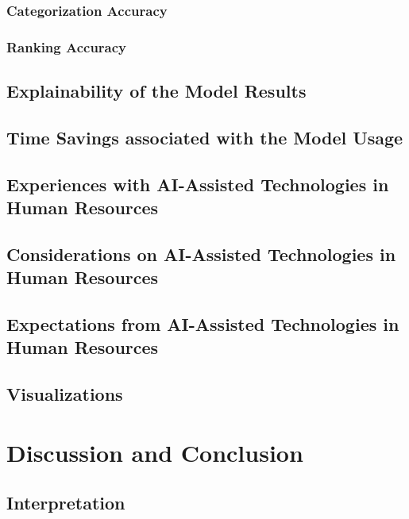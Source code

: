 \documentclass[draft,final]{thesisclass} %
\begin{document}
\subsection{Categorization Accuracy}
\lipsum[1]

\subsection{Ranking Accuracy}
\lipsum[1]

\section{Explainability of the Model Results}
\lipsum[1]

\section{Time Savings associated with the Model Usage}
\lipsum[1]

\section{Experiences with \acs{AI}-Assisted Technologies in Human Resources}
\lipsum[1]

\section{Considerations on \acs{AI}-Assisted Technologies in Human Resources}
\lipsum[1]

\section{Expectations from \acs{AI}-Assisted Technologies in Human Resources}
\lipsum[1]

\section{Visualizations}
\lipsum[1]

\chapter{Discussion and Conclusion} \label{discussion_and_conclusion}

\section{Interpretation}
\lipsum[1]
\end{document}

